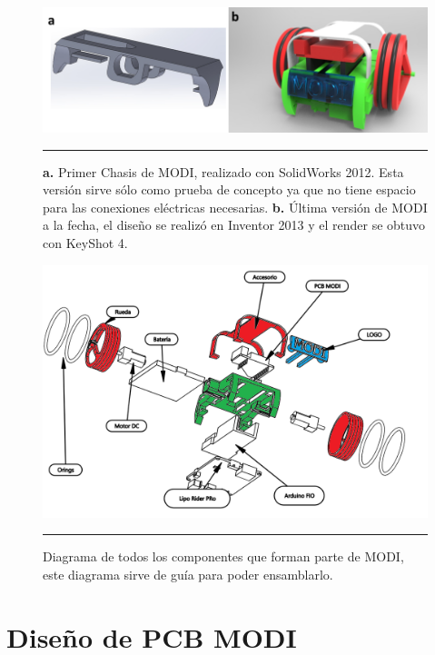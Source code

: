 \begin{figure}[htbp]
	\centering
		\includegraphics[width=\textwidth]{./Figures/MODI/compRender.png}
		\rule{35em}{0.5pt}
	\caption[Comparación entre el primer render realizado y el último]{\textbf{ a.} Primer Chasis de MODI, realizado con SolidWorks 2012. Esta versión sirve sólo como prueba de concepto ya que no tiene espacio para las conexiones eléctricas necesarias.\textbf{ b.} Última versión de MODI a la fecha, el diseño se realizó en Inventor 2013 y el render se obtuvo con KeyShot 4.}
	\label{fig:compRender}
\end{figure}	

\begin{figure}[htbp]
	\centering
		\includegraphics[width=\textwidth]{./Figures/MODI/ensamble.png}
		\rule{35em}{0.5pt}
	\caption[Diagrama MODI versión final]{Diagrama de todos los componentes que forman parte de MODI, este diagrama sirve de guía para poder ensamblarlo.}
	\label{fig:DiagramaVersionFinal}
\end{figure}	

\FloatBarrier
\section{Diseño de PCB MODI}

